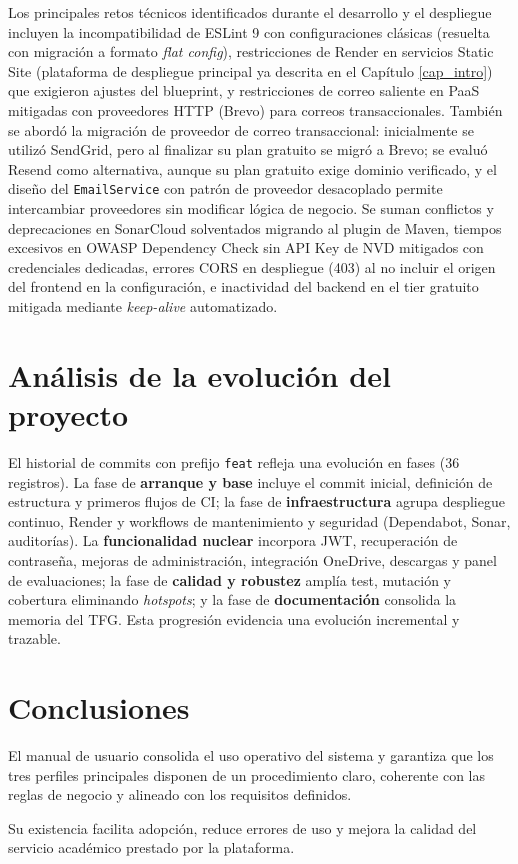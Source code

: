 Los principales retos t\'ecnicos identificados durante el desarrollo y el despliegue incluyen la incompatibilidad de ESLint 9 con configuraciones cl\'asicas (resuelta con migraci\'on a formato \textit{flat config}), restricciones de Render en servicios Static Site (plataforma de despliegue principal ya descrita en el Cap\'itulo \ref{cap_intro}) que exigieron ajustes del blueprint, y restricciones de correo saliente en PaaS mitigadas con proveedores HTTP (Brevo) para correos transaccionales. Tambi\'en se abord\'o la migraci\'on de proveedor de correo transaccional: inicialmente se utiliz\'o SendGrid, pero al finalizar su plan gratuito se migr\'o a Brevo; se evalu\'o Resend como alternativa, aunque su plan gratuito exige dominio verificado, y el dise\~no del \texttt{EmailService} con patr\'on de proveedor desacoplado permite intercambiar proveedores sin modificar l\'ogica de negocio. Se suman conflictos y deprecaciones en SonarCloud \cite{sonarcloud} solventados migrando al plugin de Maven, tiempos excesivos en OWASP Dependency Check sin API Key de NVD mitigados con credenciales dedicadas, errores CORS en despliegue (403) al no incluir el origen del frontend en la configuraci\'on, e inactividad del backend en el tier gratuito mitigada mediante \textit{keep-alive} automatizado.

\FloatBarrier

\section{An\'alisis de la evoluci\'on del proyecto}

El historial de commits con prefijo \texttt{feat} refleja una evoluci\'on en fases (36 registros). La fase de \textbf{arranque y base} incluye el commit inicial, definici\'on de estructura y primeros flujos de CI; la fase de \textbf{infraestructura} agrupa despliegue continuo, Render y workflows de mantenimiento y seguridad (Dependabot, Sonar, auditor\'ias). La \textbf{funcionalidad nuclear} incorpora JWT, recuperaci\'on de contrase\~na, mejoras de administraci\'on, integraci\'on OneDrive, descargas y panel de evaluaciones; la fase de \textbf{calidad y robustez} ampl\'ia test, mutaci\'on y cobertura eliminando \textit{hotspots}; y la fase de \textbf{documentaci\'on} consolida la memoria del TFG. Esta progresi\'on evidencia una evoluci\'on incremental y trazable.

\FloatBarrier

\section{Conclusiones}

El manual de usuario consolida el uso operativo del sistema y garantiza que los tres perfiles principales disponen de un procedimiento claro, coherente con las reglas de negocio y alineado con los requisitos definidos.

Su existencia facilita adopci\'on, reduce errores de uso y mejora la calidad del servicio acad\'emico prestado por la plataforma.

